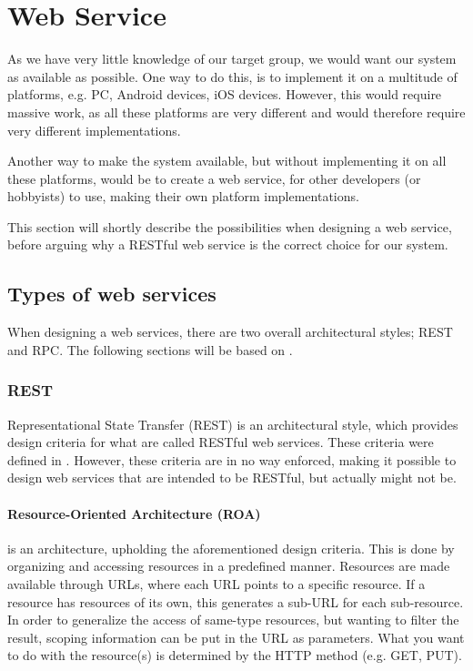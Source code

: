\section{Web Service}
As we have very little knowledge of our target group, we would want our system as available as possible.
One way to do this, is to implement it on a multitude of platforms, e.g. PC, Android devices, iOS devices.
However, this would require massive work, as all these platforms are very different and would therefore require very different implementations.

Another way to make the system available, but without implementing it on all these platforms, would be to create a web service, for other developers (or hobbyists) to use, making their own platform implementations.

This section will shortly describe the possibilities when designing a web service, before arguing why a RESTful web service is the correct choice for our system.

\subsection{Types of web services}
When designing a web services, there are two overall architectural styles; REST and RPC.
The following sections will be based on \citet{restful_web_services}.

\subsubsection{REST}
Representational State Transfer (REST) is an architectural style, which provides design criteria for what are called RESTful web services.
These criteria were defined in \citet{fielding_dissertation}.
However, these criteria are in no way enforced, making it possible to design web services that are intended to be RESTful, but actually might not be.

\paragraph{Resource-Oriented Architecture (ROA)} is an architecture, upholding the aforementioned design criteria.
This is done by organizing and accessing resources in a predefined manner.
Resources are made available through URLs, where each URL points to a specific resource.
If a resource has resources of its own, this generates a sub-URL for each sub-resource.
In order to generalize the access of same-type resources, but wanting to filter the result, scoping information can be put in the URL as parameters.
What you want to do with the resource(s) is determined by the HTTP method (e.g. GET, PUT).

